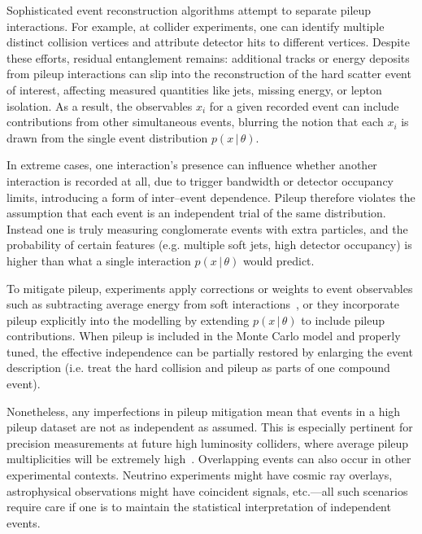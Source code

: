         Sophisticated event reconstruction algorithms attempt to separate pileup interactions.
        For example, at collider experiments, one can identify multiple distinct collision vertices and attribute detector hits to different vertices.
        Despite these efforts, residual entanglement remains: additional tracks or energy deposits from pileup interactions can slip into the reconstruction of the hard scatter event of interest, affecting measured quantities like jets, missing energy, or lepton isolation.
        As a result, the observables $x_i$ for a given recorded event can include contributions from other simultaneous events, blurring the notion that each $x_i$ is drawn from the single event distribution $p(x\,|\,\theta)$.
        
        In extreme cases, one interaction's presence can influence whether another interaction is recorded at all, due to trigger bandwidth or detector occupancy limits, introducing a form of inter--event dependence.
        Pileup therefore violates the assumption that each event is an independent trial of the same distribution.
        Instead one is truly measuring conglomerate events with extra particles, and the probability of certain features (e.g. multiple soft jets, high detector occupancy) is higher than what a single interaction $p(x\,|\,\theta)$ would predict.
        
        To mitigate pileup, experiments apply corrections or weights to event observables such as subtracting average energy from soft interactions~\cite{CMS:2016lmd, CMS:2020cmk, Cacciari:2014gra}, or they incorporate pileup explicitly into the modelling by extending $p(x\,|\,\theta)$ to include pileup contributions.
        When pileup is included in the Monte Carlo model and properly tuned, the effective independence can be partially restored by enlarging the event description (i.e. treat the hard collision and pileup as parts of one compound event).
        
        Nonetheless, any imperfections in pileup mitigation mean that events in a high pileup dataset are not as independent as assumed.
        This is especially pertinent for precision measurements at future high luminosity colliders, where average pileup multiplicities will be extremely high~\cite{Lobanov:2020hhr, Komiske2018PileupPUMML, Maier:2021ymx, CMSCollaboration2024LuminosityExperiment, Kuehn:2021uzo}.
        Overlapping events can also occur in other experimental contexts.
        Neutrino experiments might have cosmic ray overlays, astrophysical observations might have coincident signals, etc.---all such scenarios require care if one is to maintain the statistical interpretation of independent events.
        
